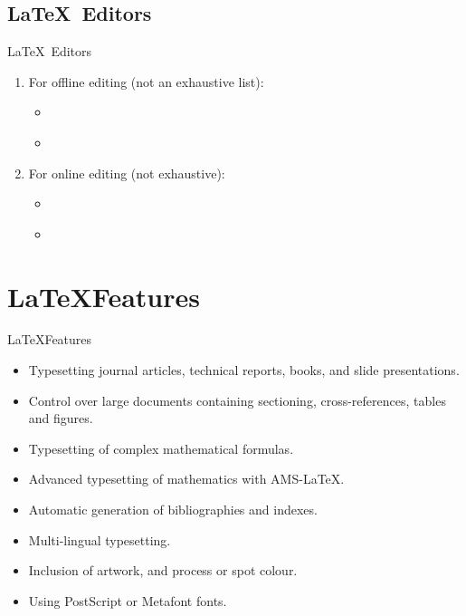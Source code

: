 \documentclass{beamer}
\begin{document}
\subsection{\LaTeX\ Editors}\hypertarget{texteditors}{}
\begin{frame}{\LaTeX\ Editors}
\begin{enumerate}
    \item For offline editing (not an exhaustive list): \\
	\begin{itemize}
		\item \href{http://www.xm1math.net/texmaker/}{}
		\item \href{https://www.texstudio.org/}{}
	\end{itemize}
    \item For online editing (not exhaustive): \\
	\begin{itemize}
		\item \href{https://www.sharelatex.com/}{}
		\item \href{https://www.overleaf.com/}{}
	\end{itemize}
\end{enumerate}
\end{frame}

\section{\LaTeX Features}
\begin{frame}{\LaTeX Features}
	\begin{itemize}
		\item Typesetting journal articles, technical reports, books, and slide presentations.
        \item Control over large documents containing sectioning, cross-references, tables and figures.
        \item Typesetting of complex mathematical formulas.
        \item Advanced typesetting of mathematics with AMS-LaTeX.
        \item Automatic generation of bibliographies and indexes.
        \item Multi-lingual typesetting.
        \item Inclusion of artwork, and process or spot colour.
        \item Using PostScript or Metafont fonts.
	\end{itemize}
\end{frame}
\end{document}
